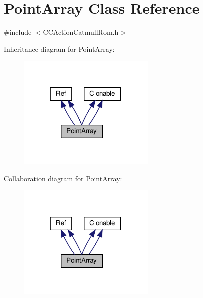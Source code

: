 \hypertarget{classPointArray}{}\section{Point\+Array Class Reference}
\label{classPointArray}


{\ttfamily \#include $<$C\+C\+Action\+Catmull\+Rom.\+h$>$}



Inheritance diagram for Point\+Array\+:
\nopagebreak
\begin{figure}[H]
\begin{center}
\leavevmode
\includegraphics[width=186pt]{classPointArray__inherit__graph}
\end{center}
\end{figure}


Collaboration diagram for Point\+Array\+:
\nopagebreak
\begin{figure}[H]
\begin{center}
\leavevmode
\includegraphics[width=186pt]{classPointArray__coll__graph}
\end{center}
\end{figure}
